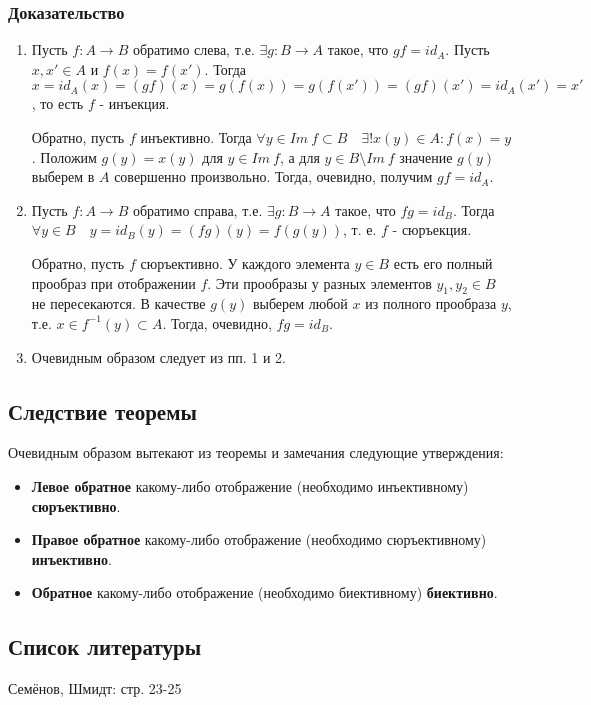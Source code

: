 \documentclass{article}
\begin{document}
\subsubsection*{Доказательство}
\begin{enumerate}
\item Пусть $f: A \rightarrow B$ обратимо слева, т.е. $\exists g : B \rightarrow A$ такое, что $gf = id_A$. Пусть $x, x' \in A$ и $f(x) = f(x')$. Тогда $x = id_A(x) = (gf)(x) = g(f(x)) = g(f(x')) = (gf)(x') = id_A(x') = x'$, то есть $f$ - инъекция.

Обратно, пусть $f$ инъективно. Тогда $\forall y \in Im~f \subset B \quad \exists ! x(y) \in A : f(x) = y$. Положим $g(y) = x(y)$ для $y \in Im~f$, а для $y \in B \setminus Im~f$ значение $g(y)$ выберем в $A$ совершенно произвольно. Тогда, очевидно, получим $gf = id_A$.

\item Пусть $f : A \rightarrow B$ обратимо справа, т.е. $\exists g : B \rightarrow A$ такое, что $fg = id_B$. Тогда $\forall y \in B \quad y = id_B(y) = (fg)(y) = f(g(y))$, т. е. $f$ - сюръекция.

Обратно, пусть $f$ сюръективно. У каждого элемента $y \in B$ есть его полный прообраз при отображении $f$. Эти прообразы у разных элементов $y_1, y_2 \in B$ не пересекаются. В качестве $g(y)$ выберем любой $x$ из полного прообраза $y$, т.е. $x \in f^{-1}(y) \subset A$. Тогда, очевидно, $fg = id_B$.

\item Очевидным образом следует из пп. 1 и 2.
\end{enumerate}

\subsection{Следствие теоремы}
Очевидным образом вытекают из теоремы и замечания следующие утверждения:

\begin{itemize}
\item \textbf{Левое обратное} какому-либо отображение (необходимо инъективному) \textbf{сюръективно}.
\item \textbf{Правое обратное} какому-либо отображение (необходимо сюръективному) \textbf{инъективно}.
\item \textbf{Обратное} какому-либо отображение (необходимо биективному) \textbf{биективно}.
\end{itemize}


\subsection*{Список литературы}
Семёнов, Шмидт: стр. 23-25
\end{document}
